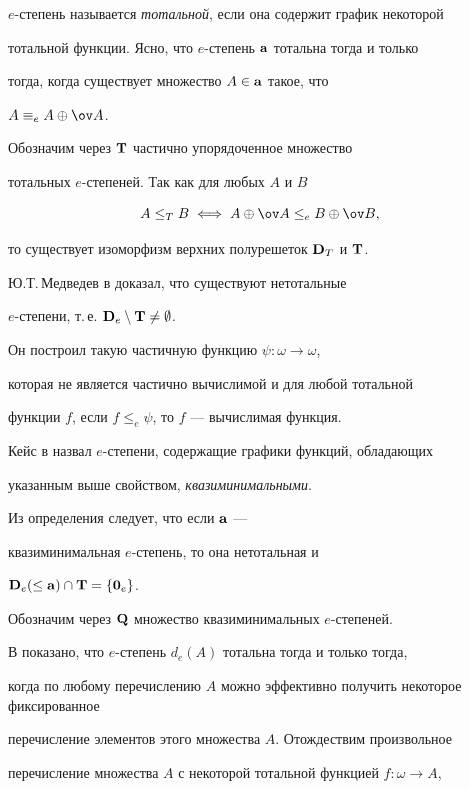 $e$-степень называется {\it тотальной}, если она содержит график некоторой


тотальной функции. Ясно, что $e$-степень ${\bold a}$ тотальна тогда и только


тогда, когда существует множество $A\in{\bold a}$ такое, что


$A\equiv_eA\oplus\ov A$.


Обозначим через ${\bold T}$ частично упорядоченное множество


тотальных $e$-степеней. Так как для любых $A$ и $B$


$$


A\leq_TB\iff A\oplus\ov A\leq_eB\oplus\ov B,


$$


то существует изоморфизм верхних полурешеток ${\bold D}_T$ и ${\bold T}$.





Ю.Т.\,Медведев в \cite{r5} доказал, что существуют нетотальные


$e$-степени, т.\,е. ${\bold D}_e\setminus{\bold T}\neq\emptyset$.


Он построил такую частичную функцию $\psi :\omega\to\omega$,


которая не является частично вычислимой и для любой тотальной


функции $f$, если $f\leq_e\psi$, то $f$ --- вычислимая функция.


Кейс в \cite{r3} назвал $e$-степени, содержащие графики функций, обладающих


указанным выше свойством, {\it квазиминимальными}.


Из определения следует, что если ${\bold a}$ ---


квазиминимальная $e$-степень, то она нетотальная и


${\bold D}_e(\leq{\bold a})\cap{\bold T}=\{{\bold 0}_e\}$.


Обозначим через ${\bold Q}$ множество квазиминимальных $e$-степеней.





В \cite{r3} показано, что $e$-степень $d_e(A)$ тотальна тогда и только тогда,


когда по любому перечислению $A$ можно эффективно получить некоторое фиксированное


перечисление элементов этого множества $A$. Отождествим произвольное


перечисление множества $A$ с некоторой тотальной функцией $f:\omega\to A$,


